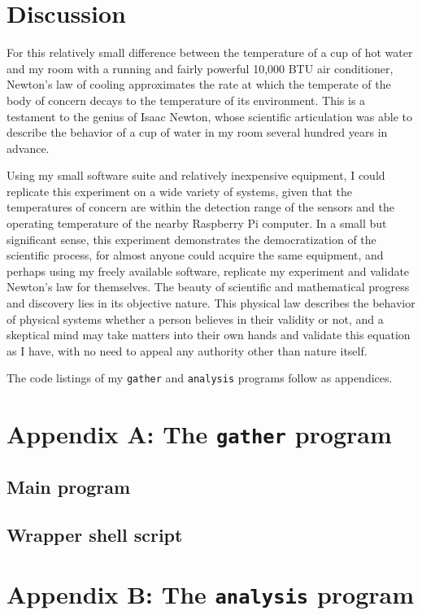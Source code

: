 \documentclass[12pt]{article}
\begin{document}
\section{Discussion}

For this relatively small difference
between the temperature of a cup of hot water
and my room with a running and fairly powerful 10,000 BTU air conditioner,
Newton's law of cooling approximates
the rate at which the temperate of the body of concern
decays to the temperature of its environment.
This is a testament to the genius of Isaac Newton,
whose scientific articulation was able to describe
the behavior of a cup of water in my room
several hundred years in advance.

Using my small software suite
and relatively inexpensive equipment,
I could replicate this experiment
on a wide variety of systems,
given that the temperatures of concern
are within the detection range of the sensors
and the operating temperature of the nearby
Raspberry Pi computer.
In a small but significant sense,
this experiment demonstrates the democratization of the scientific process,
for almost anyone could acquire the same equipment,
and perhaps using my freely available software,
replicate my experiment and validate Newton's law for themselves.
The beauty of scientific and mathematical progress and discovery
lies in its objective nature.
This physical law describes the behavior of physical systems
whether a person believes in their validity or not,
and a skeptical mind may take matters into their own hands
and validate this equation as I have,
with no need to appeal any authority other than nature itself.

\medskip
\noindent
The code listings of my \texttt{gather} and \texttt{analysis} programs follow as appendices.

\section{Appendix A: The \texttt{gather} program} \label{apxA}

\subsection{Main program}



\subsection{Wrapper shell script}



\section{Appendix B: The \texttt{analysis} program} \label{apxB}





\end{document}
